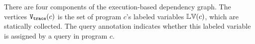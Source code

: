%
%
% 
% 
There are four components of the execution-based dependency graph. 
The vertices $\mathtt{{V_{trace}}}(c)$ is the set of program $c$'s labeled variables $\mathbb{LV}(c)$,
which are statically collected.
The query annotation 
indicates whether this labeled variable is assigned by a query in program $c$.
